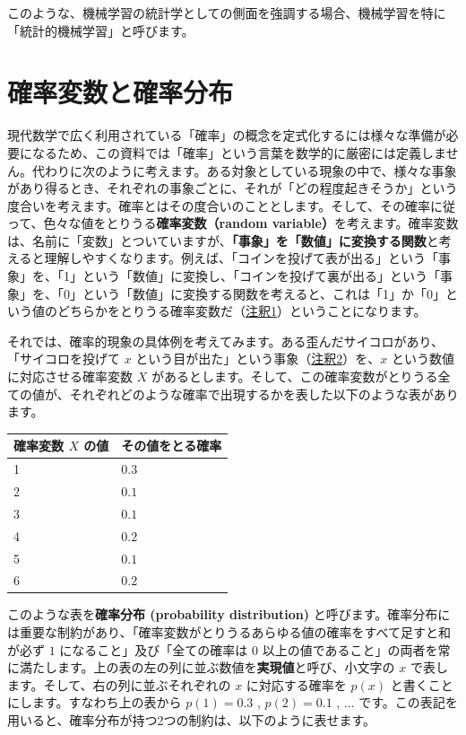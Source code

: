 このような、機械学習の統計学としての側面を強調する場合、機械学習を特に「統計的機械学習」と呼びます。


\section{確率変数と確率分布}


現代数学で広く利用されている「確率」の概念を定式化するには様々な準備が必要になるため、この資料では「確率」という言葉を数学的に厳密には定義しません。代わりに次のように考えます。ある対象としている現象の中で、様々な事象があり得るとき、それぞれの事象ごとに、それが「どの程度起きそうか」という度合いを考えます。確率とはその度合いのこととします。そして、その確率に従って、色々な値をとりうる\textbf{確率変数（random variable）}を考えます。確率変数は、名前に「変数」とついていますが、\textbf{「事象」を「数値」に変換する関数}と考えると理解しやすくなります。例えば、「コインを投げて表が出る」という「事象」を、「1」という「数値」に変換し、「コインを投げて裏が出る」という「事象」を、「0」という「数値」に変換する関数を考えると、これは「1」か「0」という値のどちらかをとりうる確率変数だ（\hyperref[06b-basics-of-probability-statistics-note1]{注釈1}）ということになります。


それでは、確率的現象の具体例を考えてみます。ある歪んだサイコロがあり、「サイコロを投げて $x$ という目が出た」という事象（\hyperref[06b-basics-of-probability-statistics-note2]{注釈2}）を、$x$ という数値に対応させる確率変数 $X$ があるとします。そして、この確率変数がとりうる全ての値が、それぞれどのような確率で出現するかを表した以下のような表があります。


\begin{center}
\begin{tabular}{|l|l|}
\hline
確率変数 $X$ の値 & その値をとる確率 \\
\hline
1 & $0.3$ \\
2 & $0.1$ \\
3 & $0.1$ \\
4 & $0.2$ \\
5 & $0.1$ \\
6 & $0.2$ \\
\hline
\end{tabular}
\end{center}


このような表を\textbf{確率分布 (probability distribution)} と呼びます。確率分布には重要な制約があり、「確率変数がとりうるあらゆる値の確率をすべて足すと和が必ず $1$ になること」及び「全ての確率は $0$ 以上の値であること」の両者を常に満たします。上の表の左の列に並ぶ数値を\textbf{実現値}と呼び、小文字の $x$ で表します。そして、右の列に並ぶそれぞれの $x$ に対応する確率を $p(x)$ と書くことにします。すなわち上の表から $p(1) = 0.3$ , $p(2) = 0.1$ , $\ldots$ です。この表記を用いると、確率分布が持つ2つの制約は、以下のように表せます。


